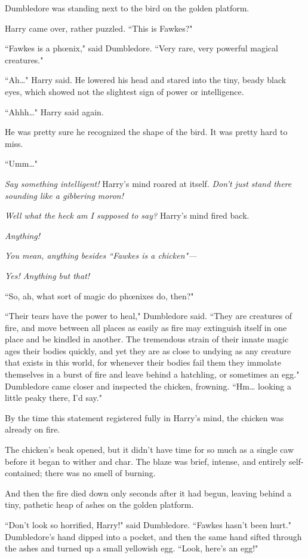 Dumbledore was standing next to the bird on the golden platform.

Harry came over, rather puzzled. ``This is Fawkes?"

``Fawkes is a phœnix," said Dumbledore. ``Very rare, very powerful magical creatures."

``Ah{\ldots}" Harry said. He lowered his head and stared into the tiny, beady black eyes, which showed not the slightest sign of power or intelligence.

``Ahhh{\ldots}" Harry said again.

He was pretty sure he recognized the shape of the bird. It was pretty hard to miss.

``Umm{\ldots}"

\emph{Say something intelligent!} Harry's mind roared at itself. \emph{Don't just stand there sounding like a gibbering moron!}

\emph{Well what the heck am I \emph{supposed} to say?} Harry's mind fired back.

\emph{Anything!}

\emph{You mean, anything besides ``Fawkes is a chicken"—}

\emph{Yes! Anything but that!}

``So, ah, what sort of magic do phœnixes do, then?"

``Their tears have the power to heal," Dumbledore said. ``They are creatures of fire, and move between all places as easily as fire may extinguish itself in one place and be kindled in another. The tremendous strain of their innate magic ages their bodies quickly, and yet they are as close to undying as any creature that exists in this world, for whenever their bodies fail them they immolate themselves in a burst of fire and leave behind a hatchling, or sometimes an egg." Dumbledore came closer and inspected the chicken, frowning. ``Hm{\ldots} looking a little peaky there, I'd say."

By the time this statement registered fully in Harry's mind, the chicken was already on fire.

The chicken's beak opened, but it didn't have time for so much as a single caw before it began to wither and char. The blaze was brief, intense, and entirely self-contained; there was no smell of burning.

And then the fire died down only seconds after it had begun, leaving behind a tiny, pathetic heap of ashes on the golden platform.

``Don't look so horrified, Harry!" said Dumbledore. ``Fawkes hasn't been hurt." Dumbledore's hand dipped into a pocket, and then the same hand sifted through the ashes and turned up a small yellowish egg. ``Look, here's an egg!"

